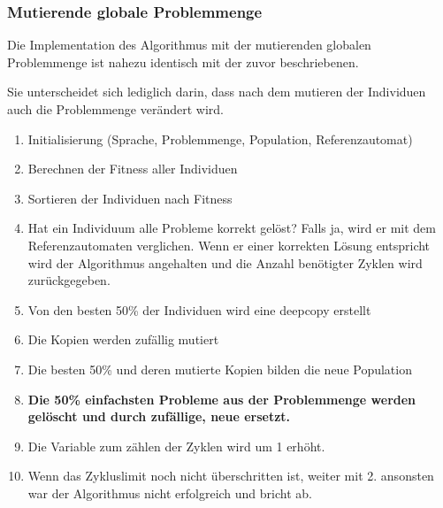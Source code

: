 \subsubsection{Mutierende globale Problemmenge}
Die Implementation des Algorithmus mit der mutierenden globalen Problemmenge ist nahezu identisch mit der zuvor beschriebenen.

Sie unterscheidet sich lediglich darin, dass nach dem mutieren der Individuen auch die Problemmenge verändert wird.

\begin{enumerate}
\item Initialisierung (Sprache, Problemmenge, Population, Referenzautomat)
\item Berechnen der Fitness aller Individuen
\item Sortieren der Individuen nach Fitness
\item Hat ein Individuum alle Probleme korrekt gelöst? Falls ja, wird er mit dem Referenzautomaten verglichen. Wenn er einer korrekten Lösung entspricht wird der Algorithmus angehalten und die Anzahl benötigter Zyklen wird zurückgegeben.
\item Von den besten 50\% der Individuen wird eine \Gls{deepcopy} erstellt
\item Die Kopien werden zufällig mutiert
\item Die besten 50\% und deren mutierte Kopien bilden die neue Population
\item \textbf{Die 50\% einfachsten Probleme aus der Problemmenge werden gelöscht und durch zufällige, neue ersetzt.}
\item Die Variable zum zählen der Zyklen wird um 1 erhöht.
\item Wenn das Zykluslimit noch nicht überschritten ist, weiter mit 2. ansonsten war der Algorithmus nicht erfolgreich und bricht ab.
\end{enumerate}